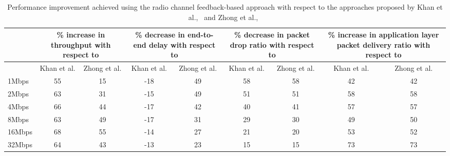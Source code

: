 \begin{table}[!htb]
	\centering
    \caption{Performance improvement achieved using the radio channel feedback-based approach with respect to the approaches proposed by Khan et al.,~\cite{khan2015towards} and Zhong et al.,~\cite{zhong2014capacity}}
  \label{tab:topology4RadioChannelImprovement}
  \renewcommand\multirowsetup{\centering}
    \begin{tabular}{|>{\centering} p{}|c|c|c|c|c|c|c|c|}
    \hline
    \multirow{2}{0.12\textwidth}{\newline \newline \newline Application data rate} & \multicolumn{2}{|p{0.12\textwidth}|}{\centering\% increase in throughput with respect to} & \multicolumn{2}{|p{0.12\textwidth}|}{\centering\% decrease in end-to-end delay with respect to} & \multicolumn{2}{|p{0.12\textwidth}|}{\centering\% decrease in packet drop ratio with respect to} & \multicolumn{2}{|p{0.16\textwidth}|}{\centering\% increase in application layer packet delivery ratio with respect to}\\
    \cline{2-9}
          & \multicolumn{1}{|p{0.06\textwidth}|}{\centering Khan et al.} & \multicolumn{1}{|p{0.06\textwidth}|}{\centering Zhong et al.} & \multicolumn{1}{|p{0.06\textwidth}|}{\centering Khan et al.} & \multicolumn{1}{|p{0.06\textwidth}|}{\centering Zhong et al.} & \multicolumn{1}{|p{0.06\textwidth}|}{\centering Khan et al.} & \multicolumn{1}{|p{0.06\textwidth}|}{\centering Zhong et al.} & \multicolumn{1}{|p{0.08\textwidth}|}{\centering Khan et al.} & \multicolumn{1}{|p{0.08\textwidth}|}{\centering Zhong et al.}\\
    \hline 
    1Mbps & 55 & 15 & -18 & 49 & 58 & 58 & 42 & 42 \\\hline 
    2Mbps & 63 & 31 & -15 & 49 & 51 & 51 & 58 & 58 \\\hline 
    4Mbps & 66 & 44 & -17 & 42 & 40 & 41 & 57 & 57 \\\hline 
    8Mbps & 63 & 49 & -17 & 31 & 29 & 30 & 49 & 50 \\\hline 
    16Mbps & 68 & 55 & -14 & 27 & 21 & 20 & 53 & 52 \\\hline 
    32Mbps & 64 & 43 & -13 & 23 & 15 & 15 & 73 & 73 \\\hline 
    \end{tabular}%
\end{table}


